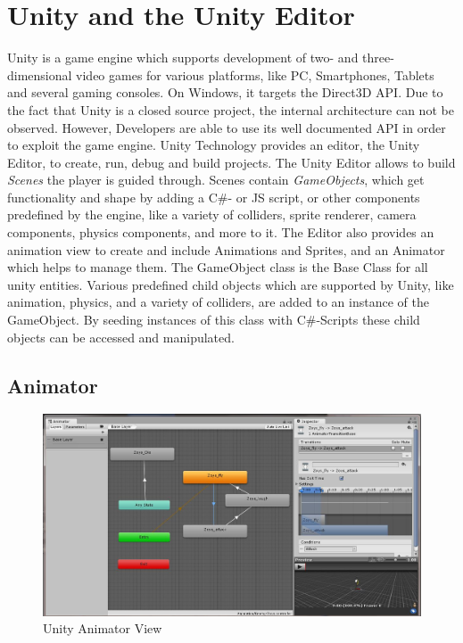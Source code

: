 \section{Unity and the Unity Editor}
Unity is a game engine which supports development of two- and three-dimensional video games for various platforms, like PC, Smartphones, Tablets and several gaming consoles. On Windows, it targets the Direct3D API. Due to the fact that Unity is a closed source project, the internal architecture can not be observed. However, Developers are able to use its well documented API in order to exploit the game engine. Unity Technology provides an editor, the Unity Editor, to create, run, debug and build projects.
The Unity Editor allows to build \textit{Scenes} the player is guided through. Scenes contain \textit{GameObjects}, which get functionality and shape by adding a C\#- or JS script, or other components predefined by the engine, like a variety of colliders, sprite renderer, camera components, physics components, and more to it. The Editor also provides an animation view to create and include Animations and Sprites, and an Animator which helps to manage them. The GameObject class is the Base Class for all unity entities. Various predefined child objects which are supported by Unity, like animation, physics, and a variety of colliders, are added to an instance of the GameObject. By seeding instances of this class with C\#-Scripts these child objects can be accessed and manipulated.

\subsection{Animator}

\begin{figure}
	\centering
	\includegraphics[scale=0.35]{grafiken/unityanimator.jpg}
	\caption{Unity Animator View}
	\label{fig:3}
\end{figure}


